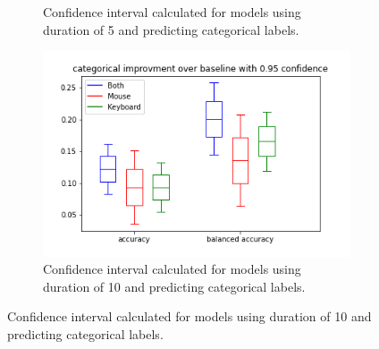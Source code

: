 \documentclass[../main.tex]{subfiles}
\begin{document}
\begin{figure}[!h]
\begin{subfigure}[b]{0.31\textwidth}
        \caption{Confidence interval calculated for models using duration of 5 and predicting categorical labels.}
    \end{subfigure}
    \begin{subfigure}[b]{0.31\textwidth}
        \centering
        \includegraphics[width=\textwidth]{figures/results/interval_difference/10/10_categorical_0.95.png}
        \captionsetup{justification=centering}
        \caption{Confidence interval calculated for models using duration of 10 and predicting categorical labels.}
    \end{subfigure}



\end{figure}
\end{document}
